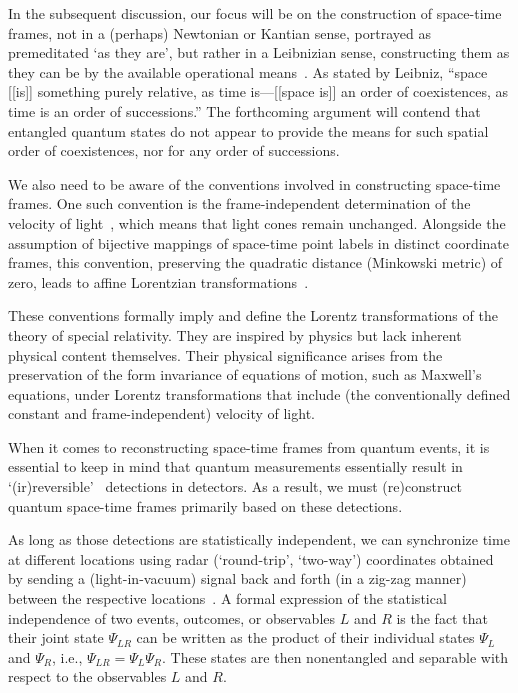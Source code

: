 \documentclass[%
  reprint,
 showpacs,
 showkeys,
 preprintnumbers,
 nofootinbib,
 amsmath,amssymb,
 aps,
 pra,
  longbibliography,
 ]{revtex4-2}
\begin{document}
In the subsequent discussion, our focus will be on the construction of space-time frames, not in a (perhaps) Newtonian or Kantian sense,
portrayed as premeditated `as they are', but rather in a Leibnizian sense, constructing them as they can be by the available operational means~\cite{Ballard_1960}.
As stated by Leibniz\cite[p.~14]{Leibniz2000Mar}, ``space
[[is]] something purely relative, as time is---[[space is]] an order of coexistences, as time is an order of successions.''
The forthcoming argument will contend that entangled quantum states do not appear to provide the means
for such spatial order of coexistences, nor for any order of successions.


We also need to be aware of the conventions involved in constructing space-time frames.
One such convention is the frame-independent determination of the velocity of light~\cite{pet-83,peres-84},
which means that light cones remain unchanged.
Alongside the assumption of bijective mappings of space-time point labels in distinct coordinate frames,
this convention, preserving the quadratic distance (Minkowski metric) of zero,
leads to affine Lorentzian transformations~\cite{alex1,lester}.

These conventions formally imply and define the Lorentz transformations of the theory of special relativity.
They are inspired by physics but lack inherent physical content themselves.
Their physical significance arises from the preservation of the form invariance of equations of motion, such as Maxwell's equations,
under Lorentz transformations that include (the conventionally defined constant and frame-independent)
velocity of light.

When it comes to reconstructing space-time frames from quantum events,
it is essential to keep in mind that quantum measurements essentially result in
`(ir)reversible'~\cite{PhysRevA.25.2208,greenberger2,Ma22012013} detections in detectors.
As a result, we must (re)construct quantum space-time frames primarily based on these detections.

As long as those detections are statistically independent, we can synchronize time at different locations using
radar (`round-trip', `two-way') coordinates obtained by sending a (light-in-vacuum) signal back and forth (in a zig-zag manner)
between the respective locations~\cite{ein-05,Einstein_1910,Jammer2006Nov,Minguzzi_2011}.
A formal expression of the statistical independence of two events, outcomes, or observables $L$ and $R$
is the fact that their joint state $\Psi_{LR}$ can be written as the product
of their individual states $\Psi_{L}$ and $\Psi_{R}$, i.e., $\Psi_{LR} = \Psi_{L} \Psi_{R}$.
These states are then nonentangled and separable with respect to the observables $L$ and $R$.
\end{document}
